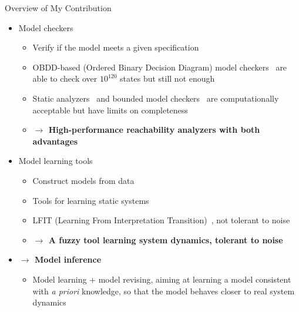 \documentclass[8pt]{beamer}
\newcommand{\highlight}[1]{\textcolor{blue!50}{\textbf{#1}}}
\begin{document}
\begin{frame}{Overview of My Contribution}
\begin{itemize}[<+->]
    \item Model checkers
    \begin{itemize}
        \item Verify if the model meets a given specification
        \item OBDD-based (Ordered Binary Decision Diagram) model checkers~\cite{brayton1996vis,cimatti2000nusmv} are able to check over $10^{120}$ states but still not enough
        \item Static analyzers~\cite{pauleve2012} and bounded model checkers~\cite{clarke2001bounded} are computationally acceptable but have limits on completeness
        \item \highlight{$\to$ High-performance reachability analyzers with both advantages}
    \end{itemize}
    \item Model learning tools
    \begin{itemize}
    	\item Construct models from data
        \item Tools for learning static systems~\cite{mochida2018statistical}
        \item LFIT (Learning From Interpretation Transition)~\cite{ribeiro2018learning}, not tolerant to noise
        \item \highlight{$\to$ A fuzzy tool learning system dynamics, tolerant to noise}  
    \end{itemize}
    \item \highlight{$\to$ Model inference}
    \begin{itemize}
        \item Model learning + model revising, aiming at learning a model consistent with \textit{a priori} knowledge, so that the model behaves closer to real system dynamics
    \end{itemize}
\end{itemize}

\vspace{0.5cm}
\Large
{}
\end{frame}
\end{document}
